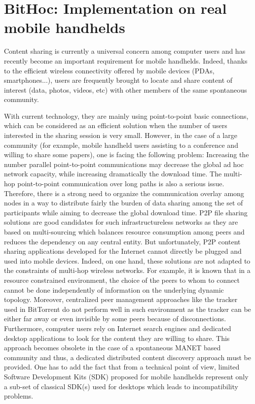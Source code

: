 \chapter{BitHoc: Implementation on real mobile handhelds}
\label{chapter:Bithoc}
\minitoc
Content sharing is currently a universal concern among computer users and has recently become an important requirement for mobile handhelds. Indeed, thanks to the efficient wireless connectivity offered by mobile devices (PDAs, smartphones...), users are frequently brought to locate and share content of interest (data, photos, videos, etc) with other members of the same spontaneous community. 

With current technology, they are mainly using point-to-point basic connections, which can be considered as an efficient solution when the number of users interested in the sharing session is very small. However, in the case of a large community (for example, mobile handheld users assisting to a conference and willing to share some papers), one is facing the following problem: Increasing the number parallel point-to-point communications may decrease the global ad hoc network capacity, while increasing dramatically the download time. The multi-hop point-to-point communication over long paths is also a serious issue. Therefore, there is a strong need to organize the communication overlay among nodes in a way to distribute fairly the burden of data sharing among the set of participants while aiming to decrease the global download time. P2P file sharing solutions are good candidates for such infrastructureless networks as they are based on multi-sourcing which balances resource consumption among peers and reduces the dependency on any central entity. But unfortunately, P2P content sharing applications developed for the Internet cannot directly be plugged and used into mobile devices. Indeed, on one hand, these solutions are not adapted to the constraints of multi-hop wireless networks. For example, it is known that in a resource constrained environment, the choice of the peers to whom to connect cannot be done independently of information on the underlying dynamic topology. Moreover, centralized peer management approaches like the tracker used in BitTorrent do not perform well in such environment as the tracker can be either far away or even invisible by some peers because of disconnections. Furthermore, computer users rely on Internet search engines and dedicated desktop applications to look for the content they are willing to share. This approach becomes obsolete in the case of a spontaneous MANET based community and thus, a dedicated distributed content discovery approach must be provided. One has to add the fact that from a technical point of view, limited Software Development Kits (SDK) proposed for mobile handhelds represent only a sub-set of classical SDK(s) used for desktops which leads to incompatibility problems.

